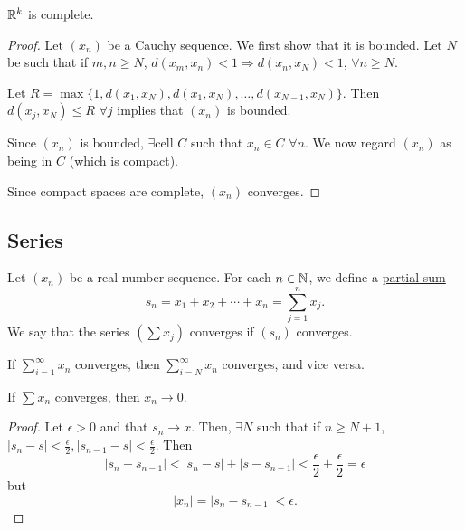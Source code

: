 \begin{theorem}
    $\mathbb R^k$ is complete.
\end{theorem}
\begin{proof}
    Let $(x_n)$ be a Cauchy sequence. We first show that it is bounded. Let $N$ be such that if $m, n\geq N$, $d(x_m, x_n) < 1 \Rightarrow d(x_n, x_N) < 1$, $\forall n \geq N$.

    Let $R = \max\{1, d(x_1, x_N), d(x_1, x_N), \dots, d(x_{N-1}, x_N)\}$. Then $d(x_j, x_N)\leq R$ $\forall j$ implies that $(x_n)$ is bounded.

    Since $(x_n)$ is bounded, $\exists \text{cell }C$ such that $x_n\in C$ $\forall n$. We now regard $(x_n)$ as being in $C$ (which is compact).

    Since compact spaces are complete, $(x_n)$ converges.

\end{proof}

\subsection{Series}
\begin{definition}
    Let $(x_n)$ be a real number sequence. For each $n\in \mathbb N$, we define a \ul{partial sum}
    \[s_n = x_1 + x_2 + \cdots + x_n = \sum^n_{j=1}x_j.\]
    We say that the series $\left(\sum x_j\right)$ converges if $(s_n)$ converges.
\end{definition}

\begin{remark}
    If $\displaystyle\sum^\infty_{i=1} x_n$ converges, then $\displaystyle\sum^\infty_{i=N}x_n$ converges, and vice versa.
\end{remark}
\begin{theorem}
    If $\sum x_n$ converges, then $x_n\to 0$.
\end{theorem}
\begin{proof}
    Let $\epsilon > 0$ and that $s_n\to x$. Then, $\exists N$ such that if $n\geq N + 1$, $|s_n - s| < \frac{\epsilon}{2}, |s_{n-1}-s| < \frac{\epsilon}{2}$. Then
    \[|s_n - s_{n-1}| < |s_n-s| + |s-s_{n-1}| < \frac{\epsilon}{2} + \frac{\epsilon}{2} = \epsilon\]
    but
    \[|x_n| = |s_n - s_{n-1}| < \epsilon.\]
\end{proof}